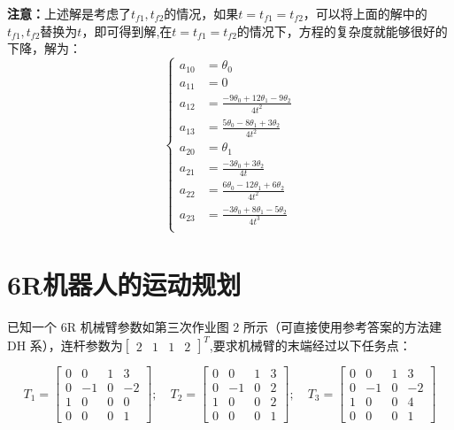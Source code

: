 \documentclass{ctexart}
\begin{document}
\textbf{注意：}上述解是考虑了$t_{f1},t_{f2}$的情况，如果$t=t_{f1}=t_{f2}$，可以将上面的解中的$t_{f1},t_{f2}$替换为$t$，即可得到解,在$t=t_{f1}=t_{f2}$的情况下，方程的复杂度就能够很好的下降，解为：
\begin{equation*}
	\left\{
	\begin{aligned}
		a_{10}& = \theta_0 \\
		a_{11}& = 0 \\
		a_{12}& = \frac{-9\theta_0+12\theta_1-9\theta_2}{4t^2} \\
		a_{13}& = \frac{5\theta_0-8\theta_1+3\theta_2}{4t^2} \\
		a_{20}& = \theta_1 \\
		a_{21}& = \frac{-3\theta_0+3\theta_2}{4t} \\
		a_{22}& = \frac{6\theta_0-12\theta_1+6\theta_2}{4t^2} \\
		a_{23}& = \frac{-3\theta_0+8\theta_1-5\theta_2}{4t^3} \\
	\end{aligned}
	\right.
\end{equation*}
\newpage
\section{6R机器人的运动规划}
已知一个 6R 机械臂参数如第三次作业图 2 所示（可直接使用参考答案的方法建 DH 系），连杆参数为$\begin{bmatrix} 2 & 1&1&2\end{bmatrix}^T$,要求机械臂的末端经过以下任务点：

\begin{equation*}
	T_1=\begin{bmatrix}
		0 & 0 & 1 & 3\\
		0 & -1 &0 & -2\\
		1 & 0 & 0 & 0\\
		0 & 0 & 0 & 1
	\end{bmatrix}
	;\quad T_2=\begin{bmatrix}
		0 & 0 & 1 & 3\\
		0 & -1 &0 & 2\\
		1 & 0 & 0 & 2\\
		0 & 0 & 0 & 1
	\end{bmatrix}
	;\quad T_3=\begin{bmatrix}
		0 & 0 & 1 & 3\\
		0 & -1 &0 & -2\\
		1 & 0 & 0 & 4\\
		0 & 0 & 0 & 1
	\end{bmatrix}
\end{equation*}
\end{document}

